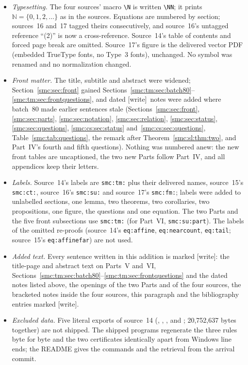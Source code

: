 \documentclass[11pt,letterpaper]{article}
\numberwithin{equation}{section}
\theoremstyle{definition}
\theoremstyle{remark}
\newcommand{\N}{\mathbb N_0}
\newcommand{\NN}{\mathbb N}
\newcommand{\wtag}{\textup{[write]}}
\begin{document}
\begin{itemize}
\item \emph{Typesetting.} The four sources' macro \verb|\N| is written \verb|\NN|; it prints $\NN=\{0,1,2,\ldots\}$ as in the sources. Equations are numbered by section; sources~16 and~17 tagged theirs consecutively, and source~16's untagged reference ``(2)'' is now a cross-reference. Source~14's table of contents and forced page break are omitted. Source~17's figure is the delivered vector PDF (embedded TrueType fonts, no Type~3 fonts), unchanged. No symbol was renamed and no normalization changed.
\item \emph{Front matter.} The title, subtitle and abstract were widened; Section~\ref{smc:sec:front} gained Sections~\ref{smc:tm:sec:batch80}--\ref{smc:tm:sec:frontquestions}, and dated \wtag\ notes were added where batch~80 made earlier sentences stale (Sections~\ref{smc:sec:front}, \ref{smc:sec:parts}, \ref{smc:sec:notation}, \ref{smc:sec:relation}, \ref{smc:sec:status}, \ref{smc:sec:questions}, \ref{smc:cs:sec:status} and~\ref{smc:cs:sec:questions}, Table~\ref{smc:tab:questions}, the remark after Theorem~\ref{smc:sl:thm:two}, and Part~IV's fourth and fifth questions). Nothing was numbered anew: the new front tables are uncaptioned, the two new Parts follow Part~IV, and all appendices keep their letters.
\item \emph{Labels.} Source~14's labels are \texttt{smc:tm:} plus their delivered names, source~15's \texttt{smc:ct:}, source~16's \texttt{smc:su:} and source~17's \texttt{smc:fm:}; labels were added to unlabelled sections, one lemma, two theorems, two corollaries, two propositions, one figure, the questions and one equation. The two Parts and the five front subsections use \texttt{smc:tm:} (for Part~VI, \texttt{smc:su:part}). The labels of the omitted re-proofs (source~14's \texttt{eq:affine}, \texttt{eq:nearcount}, \texttt{eq:tail}; source~15's \texttt{eq:affinefar}) are not used.
\item \emph{Added text.} Every sentence written in this addition is marked \wtag: the title-page and abstract text on Parts~V and~VI, Sections~\ref{smc:tm:sec:batch80}--\ref{smc:tm:sec:frontquestions} and the dated notes listed above, the openings of the two Parts and of the four sources, the bracketed notes inside the four sources, this paragraph and the bibliography entries marked \wtag.
\item \emph{Excluded data.} Five literal exports of source~14 (, , ,  and ; 20,752,637 bytes together) are not shipped. The shipped programs regenerate the three rules byte for byte and the two certificates identically apart from Windows line ends; the README gives the commands and the retrieval from the arrival commit.
\end{itemize}
\end{document}

